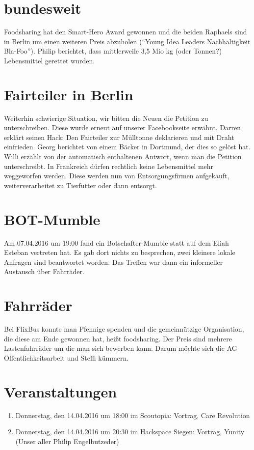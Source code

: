 \documentclass{scrreprt}
\begin{document}
\section{bundesweit}
Foodsharing hat den Smart-Hero Award gewonnen und die beiden Raphaels sind in Berlin um einen weiteren Preis abzuholen (\enquote{Young Idea Leaders Nachhaltigkeit Bla-Foo}). Philip berichtet, dass mittlerweile 3,5 Mio kg (oder Tonnen?) Lebensmittel gerettet wurden.
\section{Fairteiler in Berlin}
Weiterhin schwierige Situation, wir bitten die Neuen die Petition zu unterschreiben. Diese wurde erneut auf unserer Facebookseite erwähnt. Darren erklärt seinen Hack: Den Fairteiler zur Mülltonne deklarieren und mit Draht einfrieden. Georg berichtet von einem Bäcker in Dortmund, der dies so gelöst hat. Willi erzählt von der automatisch enthaltenen Antwort, wenn man die Petition unterschreibt. In Frankreich dürfen rechtlich keine Lebensmittel mehr weggeworfen werden. Diese werden nun von Entsorgungsfirmen aufgekauft, weiterverarbeitet zu Tierfutter oder dann entsorgt. 
\section{BOT-Mumble}
Am 07.04.2016 um 19:00 fand ein Botschafter-Mumble statt auf dem Eliah Esteban vertreten hat. Es gab dort nichts zu besprechen, zwei kleinere lokale Anfragen sind beantwortet worden. Das Treffen war dann ein informeller Austausch über Fahrräder. 
\section{Fahrräder}
Bei FlixBus konnte man Pfennige spenden und die gemeinnützige Organisation, die diese am Ende gewonnen hat, heißt foodsharing. Der Preis sind mehrere Lastenfahrräder um die man sich bewerben kann. Darum möchte sich die AG Öffentlichkeitsarbeit und Steffi kümmern.
\section{Veranstaltungen}
\begin{enumerate}
\item Donnerstag, den 14.04.2016 um 18:00 im Scoutopia: Vortrag, Care Revolution
\item Donnerstag, den 14.04.2016 um 20:30 im Hackspace Siegen: Vortrag, Yunity (Unser aller Philip Engelbutzeder)
\end{enumerate}
\end{document}
